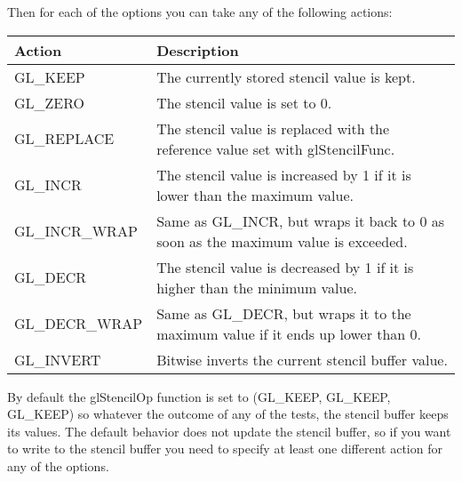 \documentclass{article}
\begin{document}
Then for each of the options you can take any of the following actions:


\begin{tabularx}{\textwidth}{ll}
Action 	&Description\\
\hline
GL\_KEEP 	& The currently stored stencil value is kept.\\
GL\_ZERO 	& The stencil value is set to 0.\\
GL\_REPLACE &	The stencil value is replaced with the reference value set with glStencilFunc.\\
GL\_INCR &	The stencil value is increased by 1 if it is lower than the maximum value.\\
GL\_INCR\_WRAP &	Same as GL\_INCR, but wraps it back to 0 as soon as the maximum value is exceeded.\\
GL\_DECR &	The stencil value is decreased by 1 if it is higher than the minimum value.\\
GL\_DECR\_WRAP &	Same as GL\_DECR, but wraps it to the maximum value if it ends up lower than 0.\\
GL\_INVERT &	Bitwise inverts the current stencil buffer value.\\
\end{tabularx}


By default the glStencilOp function is set to (GL\_KEEP, GL\_KEEP, GL\_KEEP) so whatever the outcome of any of the tests, the stencil buffer keeps its values. The default behavior does not update the stencil buffer, so if you want to write to the stencil buffer you need to specify at least one different action for any of the options.
\end{document}
